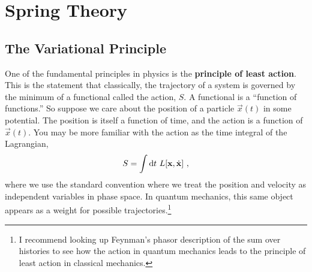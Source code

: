 
\chapter{Spring Theory}

\section{The Variational Principle}
\label{eq:variational}

One of the fundamental principles in physics is the \textbf{principle of least action}. This is the statement that classically, the trajectory of a system is governed by the minimum of a functional called th{}e action, $S$. A functional is a ``function of functions.'' So suppose we care about the position of a particle $\vec{x}(t)$ in some potential. The position is itself a function of time, and the action is a function of $\vec{x}(t)$. You may be more familiar with the action as the time integral of the Lagrangian,
\begin{align}
    S = \int \operatorname{d}\mkern-3mu^{}\mkern-1mu{t}\,\, L[\mathbf{x}, \dot{\mathbf{x}}] \ ,
\end{align}
where we use the standard convention where we treat the position and velocity as independent variables in phase space. In quantum mechanics, this same object appears as a weight for possible trajectories.\footnote{I recommend looking up Feynman's phasor description of the sum over histories to see how the action in quantum mechanics leads to the principle of least action in classical mechanics.}

